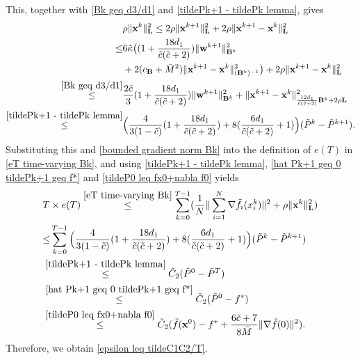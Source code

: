 \documentclass[10pt,a4paper]{amsart}
\begin{document}
This, together with \eqref{Bk geq d3/d1} and \eqref{tildePk+1 - tildePk lemma}, gives
\begin{align}
	&\rho\|\mathbf{x}^{k}\|^2_\mathbf{L}\leq 2\rho\|\mathbf{x}^{k+1}\|^2_\mathbf{L}+2\rho\|\mathbf{x}^{k+1}-\mathbf{x}^k\|^2_\mathbf{L}\notag\\
	\leq & 6\tilde{\kappa}\big((1+\frac{18d_1}{\tilde{c}(\tilde{c}+2)})\|\mathbf{w}^{k+1}\|^2_{\mathbf{B}^k}\notag\\
    &+2(c_{\mathbf{B}}+\bar{M}^2)\|\mathbf{x}^{k+1}-\mathbf{x}^k\|^2_{(\mathbf{B}^k)^{-1}}\big)+2\rho\|\mathbf{x}^{k+1}-\mathbf{x}^k\|^2_\mathbf{L}\notag\\
	\overset{\eqref{Bk geq d3/d1}}{\leq} & \frac{2\tilde{c}}{3}(1+\frac{18d_1}{\tilde{c}(\tilde{c}+2)})\|\mathbf{w}^{k+1}\|^2_{\mathbf{B}^k}+\|\mathbf{x}^{k+1}-\mathbf{x}^k\|^2_{\frac{12d_1}{\tilde{c}(\tilde{c}+2)}\mathbf{B}^k+2\rho \mathbf{L}}\notag\\
	\overset{\eqref{tildePk+1 - tildePk lemma}}{\leq}& \Big(\frac{4}{3(1-\tilde{c})}(1+\frac{18d_1}{\tilde{c}(\tilde{c}+2)})+8(\frac{6d_1}{\tilde{c}(\tilde{c}+2)}+1)\Big)(\tilde{P}^k-\tilde{P}^{k+1}).\notag
\end{align}
Substituting this and \eqref{bounded gradient norm Bk} into the definition of $e(T)$ in \eqref{eT time-varying Bk}, and using \eqref{tildePk+1 - tildePk lemma}, \eqref{hat Pk+1 geq 0 tildePk+1 geq f*} and \eqref{tildeP0 leq fx0+nabla f0} yields
\begin{align}
	&T\times e(T)\overset{\eqref{eT time-varying Bk}}{\leq} \sum_{k=0}^{T-1}(\frac{1}{N}\|\sum_{i=1}^N \nabla \tilde{f}_i(x_i^k)\|^2 + \rho\|\mathbf{x}^{k}\|^2_\mathbf{L}) \notag\\
	&{\leq}  \sum_{k=0}^{T-1}\Big(\frac{4}{3(1-\tilde{c})}(1+\frac{18d_1}{\tilde{c}(\tilde{c}+2)})+8(\frac{6d_1}{\tilde{c}(\tilde{c}+2)}+1)\Big)(\tilde{P}^k-\tilde{P}^{k+1})\notag\\
	&\overset{\eqref{tildePk+1 - tildePk lemma}}{\leq} \tilde{C}_2(\tilde{P}^0-\tilde{P}^{T})\notag\\
    &\overset{\eqref{hat Pk+1 geq 0 tildePk+1 geq f*}}{\leq} \tilde{C}_2(\tilde{P}^0-f^*)\notag\\
	&\overset{\eqref{tildeP0 leq fx0+nabla f0}}{\leq} \tilde{C}_2(\tilde{f}(\mathbf{x}^0)-f^*+\frac{6\tilde{c}+7}{8\bar{M}}\|\nabla \tilde{f}(0)\|^2).  \label{T times eT Bk} 
\end{align}
Therefore, we obtain \eqref{epsilon leq tildeC1C2/T}.
\end{document}

